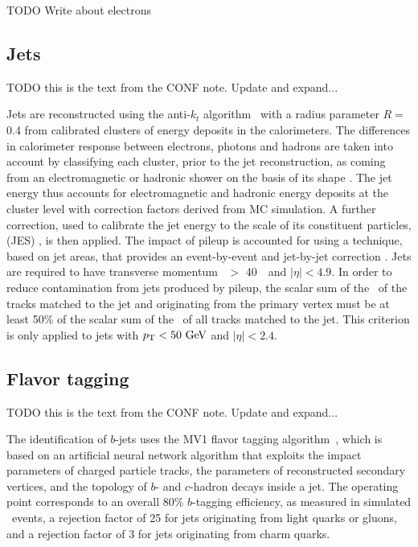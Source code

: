 {\color{red} TODO Write about electrons}

\FloatBarrier
\subsection{Jets} 
\label{sec:jets}

{\color{red} TODO this is the text from the CONF note. Update and expand...}

Jets are reconstructed using the anti-$k_{t}$
algorithm~\cite{Cacciari:2008gp, Cacciari:2005hq} with a radius
parameter $R = $ 0.4 from calibrated clusters of energy deposits in
the calorimeters. The differences in calorimeter response between
electrons, photons and hadrons are taken into account by classifying
each cluster, prior to the jet reconstruction, as coming from an
electromagnetic or hadronic shower on the basis of its shape
\cite{JES}.  The jet energy thus accounts for electromagnetic
and hadronic energy deposits at the cluster level with correction
factors derived from MC simulation.  A further correction,
used to calibrate the jet energy to the scale of its constituent
particles, (JES) \cite{JES,JES2}, is then applied.  The impact of
pileup is accounted for using
a technique, based on jet areas, that provides an event-by-event and
jet-by-jet correction \cite{Cacciari:2007fd}.  Jets are required
to have transverse momentum \pt\ $>$ 40~\GeV\ and $|\eta| < 4.9$.
In order to reduce contamination from jets produced by pileup,
the scalar sum of the \pt\ of the tracks matched to the jet and
originating from the primary vertex must be at least 50\% of the
scalar sum of the \pt\ of all tracks matched to the jet.  This
criterion is only applied to jets with $\pt < 50 \GeV$ and $|\eta| < 2.4$.

\FloatBarrier
\subsection{Flavor tagging} 
\label{sec:flavor_tagging}

{\color{red} TODO this is the text from the CONF note. Update and expand...}

The identification of $b$-jets uses the MV1 flavor tagging
algorithm~\cite{ATLAS-CONF-2014-004, ATLAS-CONF-2014-046}, which is
based on an artificial neural network
algorithm that exploits the impact parameters of charged particle
tracks, the parameters of reconstructed secondary vertices, and the
topology of $b$- and $c$-hadron decays inside a jet.  The operating
point corresponds to an overall 80\% $b$-tagging efficiency, as
measured in simulated \TTBAR\ events, a rejection factor of 25 for jets
originating from light quarks or gluons, and a rejection factor of
3 for jets originating from charm quarks.

